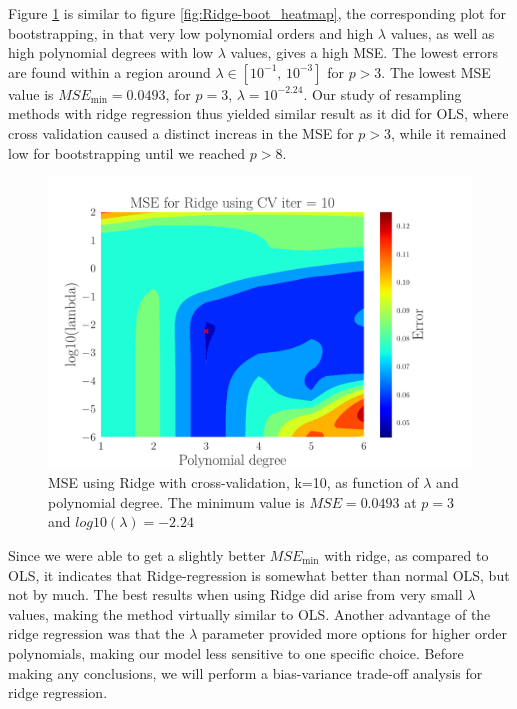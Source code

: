 \documentclass[reprint,english,notitlepage,aps,nobalancelastpage,nofootinbib]{revtex4-1}  %
\begin{document}
Figure \ref{fig:Ridge_CV_heatmap} is similar to figure \ref{fig:Ridge-boot_heatmap}, the corresponding plot for bootstrapping, in that very low polynomial orders and high $\lambda$ values, as well as high polynomial degrees with low $\lambda$ values, gives a high MSE. The lowest errors are found within a region around $\lambda\in[10^{-1},\,10^{-3}]$ for $p>3$. The lowest MSE value is $MSE_\text{min}=0.0493$, for $p=3,\, \lambda=10^{-2.24}$. Our study of resampling methods with ridge regression thus yielded similar result as it did for OLS, where cross validation caused a distinct increas in the MSE for $p>3$, while it remained low for bootstrapping until we reached $p>8$.

\begin{figure}[h]
	\begin{center}
		\includegraphics[width=0.9\linewidth]{Contour_PL_Ridge_CV10_n30_eps0.2_p1_6_lmb2_m6.pdf}
	\end{center}
	\caption{MSE using Ridge with cross-validation, k=10, as function of $\lambda$ and polynomial degree. The minimum value is $MSE=0.0493$ at $p=3$ and $log10(\lambda)=-2.24$}
	\label{fig:Ridge_CV_heatmap}
\end{figure}

Since we were able to get a slightly better $MSE_\text{min}$ with ridge, as compared to OLS, it indicates that Ridge-regression is somewhat better than normal OLS, but not by much. The best results when using Ridge did arise from very small $\lambda$ values, making the method virtually similar to OLS. Another advantage of the ridge regression was that the $\lambda$ parameter provided more options for higher order polynomials, making our model less sensitive to one specific choice. Before making any conclusions, we will perform a bias-variance trade-off analysis for ridge regression.
\end{document}
